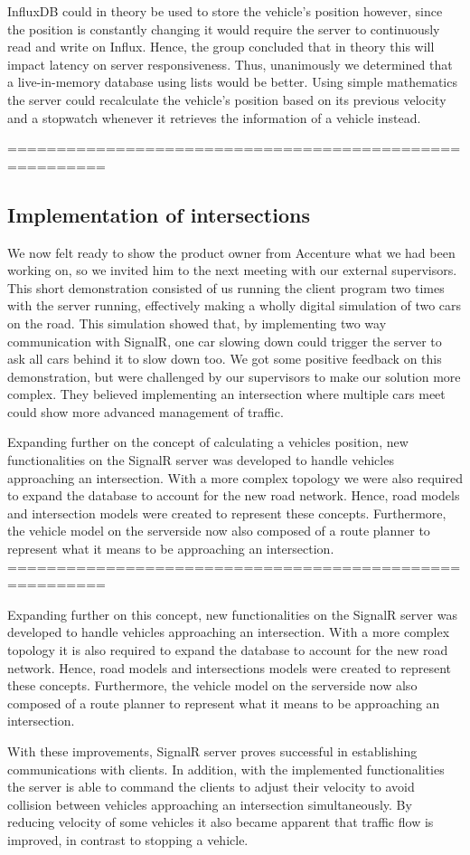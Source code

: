 InfluxDB could in theory be used to store the vehicle's position however, since the position is constantly changing it would require the server to continuously read and write on Influx. Hence, the group concluded that in theory this will impact latency on server responsiveness. Thus, unanimously we determined that a live-in-memory database using lists would be better. Using simple mathematics the server could recalculate the vehicle's position based on its previous velocity and a stopwatch whenever it retrieves the information of a vehicle instead.

========================================================
\subsection{Implementation of intersections}
We now felt ready to show the product owner from Accenture what we had been working on, so we invited him to the next meeting with our external supervisors. This short demonstration consisted of us running the client program two times with the server running, effectively making a wholly digital simulation of two cars on the road. This simulation showed that, by implementing two way communication with SignalR, one car slowing down could trigger the server to ask all cars behind it to slow down too. We got some positive feedback on this demonstration, but were challenged by our supervisors to make our solution more complex. They believed implementing an intersection where multiple cars meet could show more advanced management of traffic.

Expanding further on the concept of calculating a vehicles position, new functionalities on the SignalR server was developed to handle vehicles approaching an intersection. With a more complex topology we were also required to expand the database to account for the new road network. Hence, road models and intersection models were created to represent these concepts. Furthermore, the vehicle model on the serverside now also composed of a route planner to represent what it means to be approaching an intersection.
========================================================


Expanding further on this concept, new functionalities on the SignalR server was developed to handle vehicles approaching an intersection. With a more complex topology it is also required to expand the database to account for the new road network. Hence, road models and intersections models were created to represent these concepts. Furthermore, the vehicle model on the serverside now also composed of a route planner to represent what it means to be approaching an intersection.

With these improvements, SignalR server proves successful in establishing communications with clients. In addition, with the implemented functionalities the server is able to command the clients to adjust their velocity to avoid collision between vehicles approaching an intersection simultaneously. By reducing velocity of some vehicles it also became apparent that traffic flow is improved, in contrast to stopping a vehicle.
